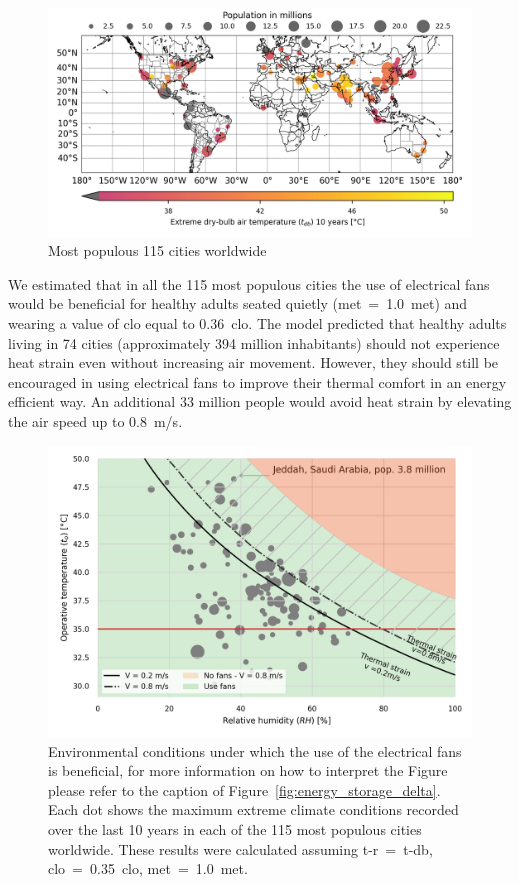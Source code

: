 \begin{figure}[thb!]
    \centering
    \includegraphics[width=\textwidth]{figures/map-population-temperature}
    \caption{Most populous 115 cities worldwide}
    \label{fig:map-population-temperature}
\end{figure}

We estimated that in all the 115 most populous cities the use of electrical fans would be beneficial for healthy adults seated quietly (\ac{met}~=~1.0~met) and wearing a value of \ac{clo} equal to 0.36~clo.
The  model predicted that healthy adults living in 74 cities (approximately 394 million inhabitants) should not experience heat strain even without increasing air movement.
However, they should still be encouraged in using electrical fans to improve their thermal comfort in an energy efficient way.
An additional 33 million people would avoid heat strain by elevating the air speed up to 0.8~m/s.

\begin{figure}[thb!]
    \centering
    \includegraphics[width=\textwidth]{figures/use_fans_and_population}
    \caption{Environmental conditions under which the use of the electrical fans is beneficial, for more information on how to interpret the Figure please refer to the caption of Figure~\ref{fig:energy_storage_delta}.
    Each dot shows the maximum extreme climate conditions recorded over the last 10 years in each of the 115 most populous cities worldwide.
    These results were calculated assuming \ac{t-r}~=~\ac{t-db}, \ac{clo}~=~0.35~clo, \ac{met}~=~1.0~met.}
    \label{fig:use_fans_and_population}
\end{figure}